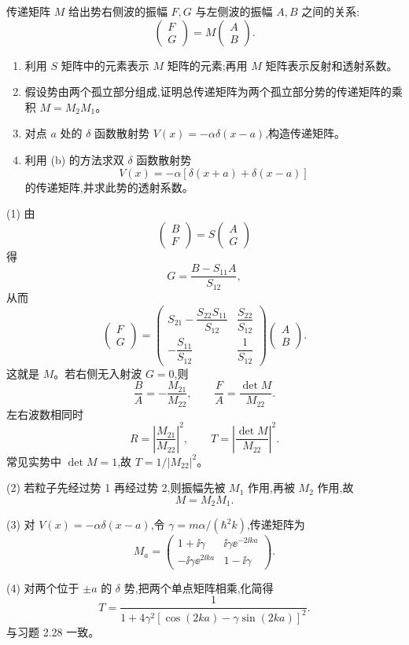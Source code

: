 \begin{question}
传递矩阵 $M$ 给出势右侧波的振幅 $F,G$ 与左侧波的振幅 $A,B$ 之间的关系:
\[
\begin{pmatrix}F\\G\end{pmatrix}=M\begin{pmatrix}A\\B\end{pmatrix}.
\]
\begin{enumerate}
\item 利用 $S$ 矩阵中的元素表示 $M$ 矩阵的元素;再用 $M$ 矩阵表示反射和透射系数。
\item 假设势由两个孤立部分组成,证明总传递矩阵为两个孤立部分势的传递矩阵的乘积 $M=M_2M_1$。
\item 对点 $a$ 处的 $\delta$ 函数散射势 $V(x)=-\alpha\delta(x-a)$,构造传递矩阵。
\item 利用 (b) 的方法求双 $\delta$ 函数散射势
\[
V(x)=-\alpha[\delta(x+a)+\delta(x-a)]
\]
的传递矩阵,并求此势的透射系数。
\end{enumerate}
\begin{solution}
(1) 由
\[
\begin{pmatrix}B\\F\end{pmatrix}
=S\begin{pmatrix}A\\G\end{pmatrix}
\]
得
\[
G=\frac{B-S_{11}A}{S_{12}},
\]
从而
\[
\begin{pmatrix}F\\G\end{pmatrix}
=\begin{pmatrix}
S_{21}-\dfrac{S_{22}S_{11}}{S_{12}}&\dfrac{S_{22}}{S_{12}}\\[0.8em]
-\dfrac{S_{11}}{S_{12}}&\dfrac1{S_{12}}
\end{pmatrix}
\begin{pmatrix}A\\B\end{pmatrix}.
\]
这就是 $M$。若右侧无入射波 $G=0$,则
\[
\frac BA=-\frac{M_{21}}{M_{22}},
\qquad
\frac FA=\frac{\det M}{M_{22}}.
\]
左右波数相同时
\[
R=\left|\frac{M_{21}}{M_{22}}\right|^2,
\qquad
T=\left|\frac{\det M}{M_{22}}\right|^2.
\]
常见实势中 $\det M=1$,故 $T=1/|M_{22}|^2$。

(2) 若粒子先经过势 1 再经过势 2,则振幅先被 $M_1$ 作用,再被 $M_2$ 作用,故
\[
M=M_2M_1.
\]

(3) 对 $V(x)=-\alpha\delta(x-a)$,令 $\gamma=m\alpha/(\hbar^2k)$,传递矩阵为
\[
M_a=\begin{pmatrix}
1+\ii\gamma&\ii\gamma \ee^{-2\ii ka}\\
-\ii\gamma \ee^{2\ii ka}&1-\ii\gamma
\end{pmatrix}.
\]

(4) 对两个位于 $\pm a$ 的 $\delta$ 势,把两个单点矩阵相乘,化简得
\[
T=\frac{1}{1+4\gamma^2[\cos(2ka)-\gamma\sin(2ka)]^2}.
\]
与习题 2.28 一致。
\end{solution}
\end{question}

